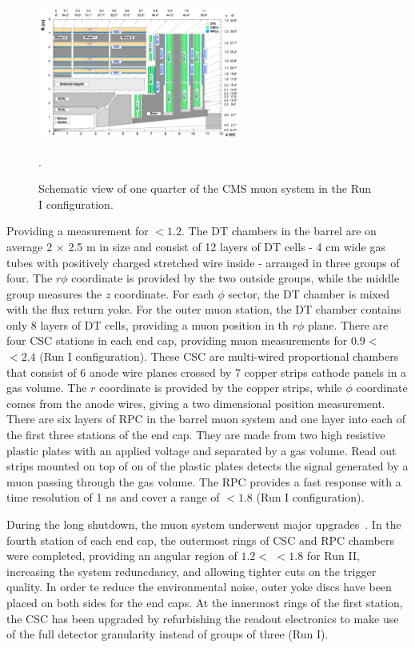 \begin{figure}[ht!]
	\centering
	\includegraphics[width=0.6\textwidth]{2_ExperimentalSetup/Figures/muonsys}
	\caption{Schematic view of one quarter of the CMS muon system in the Run I configuration. \cite{Chatrchyan:1223944}}.
	\label{fig:muonsys}
\end{figure}


Providing a measurement for \abspsrap $<1.2$. The DT chambers in the barrel are on average 2 $\times$ 2.5 \si{ \meter} in size and consist of 12 layers of DT cells - 4 \si{ \centi \meter} wide gas tubes with positively charged stretched wire inside - arranged in three groups of four. The $r\phi$ coordinate is provided by the two outside groups, while the middle group measures the $z$ coordinate. For each $\phi$ sector, the DT chamber is mixed with the flux return yoke. For the outer muon station, the DT chamber contains only 8 layers of DT cells, providing a muon position in th $r\phi$ plane.
There are four CSC stations in each end cap, providing muon measurements for $0.9<$ \abspsrap $<2.4$ (Run I configuration). These CSC are multi-wired proportional chambers that consist of 6 anode wire planes crossed by 7 copper strips cathode panels in a gas volume. The $r$ coordinate is provided by the copper strips, while $\phi$ coordinate comes from the anode wires, giving a two dimensional position measurement. 
There are six layers of RPC in the barrel muon system and one layer into each of the first three stations of the end cap. They are made from two high resistive plastic plates with an applied voltage and separated by a gas volume. Read out strips mounted on top of on of the plastic plates detects the signal generated by a muon passing through the gas volume. The RPC provides a fast response with a time resolution of 1 \si{ \nano \second} and cover a range of \abspsrap $<1.8$ (Run I configuration). 


During the long shutdown, the  muon system underwent major upgrades~\cite{Guiducci:1966038}. In the fourth station of each end cap, the outermost rings of CSC and RPC chambers were completed, providing an angular region of $1.2<$ \abspsrap $<1.8$ for Run II, increasing the system reduncdancy, and allowing tighter cuts on the trigger quality. In order te reduce the environmental noise, outer yoke discs have been placed on both sides for the end caps. 
At the innermost rings of the first station, the CSC has been upgraded by refurbishing the readout electronics to make use of the full detector granularity instead of groups of three (Run I). 
